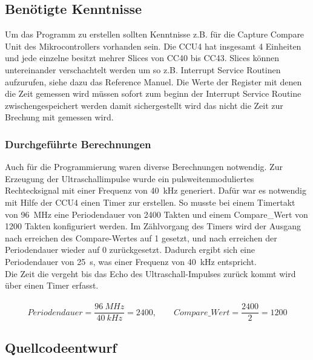 \subsection{Benötigte Kenntnisse}
Um das Programm zu erstellen sollten Kenntnisse z.B. für die Capture Compare Unit des Mikrocontrollers vorhanden sein. Die CCU4 hat insgesamt 4 Einheiten und jede einzelne besitzt mehrer Slices von CC40 bis CC43. Slices können untereinander verschachtelt werden um so z.B. Interrupt Service Routinen aufzurufen, siehe dazu das Reference Manuel.
Die Werte der Register mit denen die Zeit gemessen wird müssen sofort zum beginn der Interrupt Service Routine zwischengespeichert werden damit sichergestellt wird das nicht die Zeit zur Brechung mit gemessen wird.\\

\subsubsection{Durchgeführte Berechnungen}
Auch für die Programmierung waren diverse Berechnungen notwendig. Zur Erzeugung der Ultraschallimpulse wurde ein pulsweitenmoduliertes Rechtecksignal mit einer Frequenz von 40~kHz generiert. Dafür war es notwendig mit Hilfe der CCU4 einen Timer zur erstellen. So musste bei einem Timertakt von 96~MHz eine Periodendauer von 2400 Takten und einem Compare\_Wert von 1200 Takten  konfiguriert werden. Im Zählvorgang des Timers wird der Ausgang nach erreichen des Compare-Wertes auf 1 gesetzt, und nach erreichen der Periodendauer wieder auf 0 zurückgesetzt. Dadurch ergibt sich eine Periodendauer von 25~\textmu s, was einer Frequenz von 40~kHz entspricht.\\
Die Zeit die vergeht bis das Echo des Ultraschall-Impulses zurück kommt wird über einen Timer erfasst. 
\onehalfspacing \\ \\
\[\displaystyle Periodendauer=\frac{96~MHz}{40~kHz} = 2400,\qquad	 Compare\_Wert=\frac{2400}{2} = 1200 \] 
\singlespacing


\subsection{Quellcodeentwurf}

